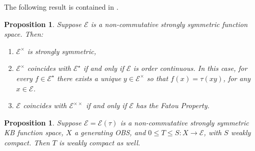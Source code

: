 \documentclass[12pt]{amsart}
\theoremstyle{plain}
\newtheorem{proposition}[theorem]{Proposition}
\theoremstyle{definition}
\renewcommand{\leq}{\leqslant}
\newcommand{\ce}{\mathcal E}
\begin{document}


The following result is contained in \cite[Section 5]{DDdP93}.

\begin{proposition}\label{prop:DDdP}
Suppose $\ce$ is a non-commutative strongly symmetric
function space. Then:
\begin{enumerate}
\item
$\ce^\times$ is strongly symmetric,
\item
$\ce^\times$ coincides with $\ce^\star$ if and only if $\ce$ is order continuous.
In this case, for every $f \in \ce^\star$ there exists a unique $y \in \ce^\times$
so that $f(x) = \tau(xy)$, for any $x \in \ce$.
\item
$\ce$ coincides with $\ce^{\times\times}$ if and only if $\ce$ has the Fatou Property.
\end{enumerate}
\end{proposition}



\begin{proposition}\label{prop:to_order_cont}
Suppose $\ce = \ce(\tau)$ is a non-commutative strongly symmetric KB
function space, $X$ a generating OBS, and
$0 \leq T \leq S : X \to \ce$, with $S$ weakly compact.
Then $T$ is weakly compact as well.
\end{proposition}
\end{document}
